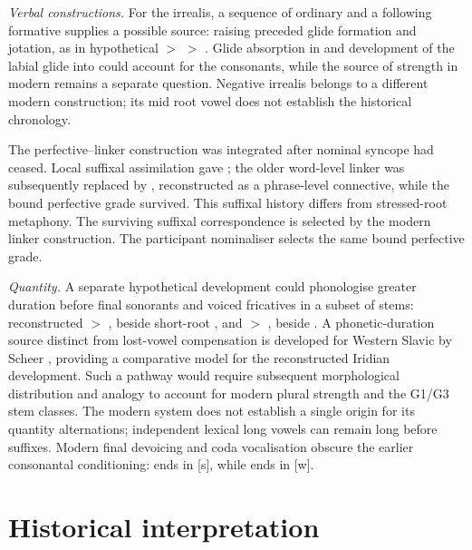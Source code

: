 \noindent\textit{Verbal constructions.}\quad
For the irrealis, a sequence of ordinary  and a following formative
 supplies a possible source: raising preceded glide formation and
jotation, as in hypothetical  $>$ 
$>$ . Glide absorption in  and development
of the labial glide into  could account for the consonants, while
the source of strength in modern  remains a separate question.
Negative irrealis  belongs to a different modern construction;
its mid root vowel does not establish the historical chronology.

The perfective--linker construction was integrated after nominal syncope had
ceased. Local suffixal assimilation gave ; the older
word-level linker was subsequently replaced by , reconstructed as a
phrase-level connective, while the bound perfective grade survived. This
suffixal history differs from stressed-root metaphony. The surviving suffixal correspondence is selected by the modern linker
construction. The participant nominaliser
 selects the same bound perfective grade.

\noindent\textit{Quantity.}\quad
A separate hypothetical development could phonologise greater duration before
final sonorants and voiced fricatives in a subset of stems: reconstructed
 $>$ , beside short-root
, and  $>$ , beside .
A phonetic-duration source distinct from lost-vowel compensation is developed
for Western Slavic by Scheer \cite{scheer2017}, providing a comparative model
for the reconstructed Iridian development.
Such a pathway would require subsequent morphological distribution and analogy
to account for modern plural strength and the G1/G3 stem classes. The modern
system does not establish a single origin for its quantity alternations;
independent lexical long vowels can remain long before suffixes.
Modern final devoicing and coda vocalisation obscure the earlier consonantal
conditioning:  ends in [s], while  ends in [w].



\section{Historical interpretation}


